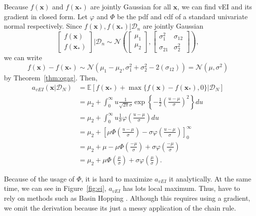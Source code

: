 Because $f(\mathbf{x})$ and $f(\mathbf{x}_*)$ are jointly Gaussian for all $\mathbf{x}$, we can find vEI and its gradient in closed form.
Let $\varphi$ and $\Phi$ be the pdf and cdf of a standard univariate normal respectively. 
Since $f(\mathbf{x}), f(\mathbf{x}_*) | \mathcal{D}_n$ are jointly Gaussian
\begin{equation*}
    \begin{bmatrix}
        f(\mathbf{x}) \\
        f(\mathbf{x}_*)
    \end{bmatrix}
    | \mathcal{D}_n
    \sim \mathcal{N}\left(
    \begin{bmatrix}
            \mu_1 \\
            \mu_2
        \end{bmatrix}
    ,
    \begin{bmatrix}
            \sigma_{1}^2 & \sigma_{12} \\
            \sigma_{21} & \sigma^2_2
        \end{bmatrix}
    \right),
\end{equation*}
we can write
\begin{equation*}
    f(\mathbf{x}) - f(\mathbf{x}_*) \sim \mathcal{N}(\mu_1 - \mu_2, \sigma_1^2 + \sigma_2^2 - 2(\sigma_{12}))
    = \mathcal{N}(\mu, \sigma^2)
\end{equation*}
by Theorem~\ref{thm:ogag}.
Then,
\begin{align*}
    a_{vEI}(\mathbf{x} | \mathcal{D}_N)
    & =  \mathbb{E}[f(\mathbf{x}_*) + \max \{  f(\mathbf{x}) - f(\mathbf{x}_*), 0 \} | \mathcal{D}_N] \\
    & = \mu_2 + \int_{0}^\infty u \frac{ 1 }{ \sqrt{2 \pi } \sigma} \exp \left\{ -\frac12 \left(\frac{ u - \mu }{ \sigma }\right)^2 \right\} du \\
    & = \mu_2 + \int_{0}^\infty u \frac{ 1 }{ \sigma } \varphi\left(\frac{ u - \mu }{ \sigma }\right) du \\
    & = \mu_2 + \left[ \mu \Phi\left(\frac{ u - \mu }{ \sigma }\right) - \sigma \varphi\left(\frac{ u - \mu }{ \sigma }\right)\right]_{0}^{\infty} \\
    & = \mu_2 +  \mu - \mu \Phi\left(\frac{ -\mu }{ \sigma }\right) + \sigma \varphi\left(\frac{ -\mu }{ \sigma }\right) \\
    & = \mu_2 + \mu \Phi\left(\frac{ \mu }{ \sigma }\right) + \sigma \varphi\left(\frac{ \mu }{ \sigma }\right).
\end{align*}

Because of the usage of $\Phi$, it is hard to maximize $a_{vEI}$ it analytically.
At the same time, we can see in Figure~\ref{fig:ei}, $a_{vEI}$ has lots local maximum.
Thus, have to rely on methods such as Basin Hopping \cite{wales1997}.
Although this requires using a gradient, we omit the derivation because its just a messy application of the chain rule.
